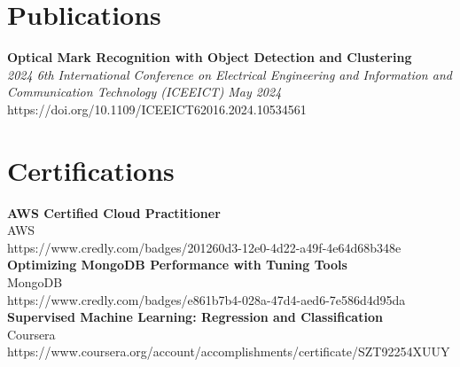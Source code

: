 \documentclass[a4paper,10pt]{article}
\begin{document}
\section*{Publications}
\textbf{Optical Mark Recognition with Object Detection and Clustering}\\
\textit{2024 6th International Conference on Electrical Engineering and Information and Communication Technology (ICEEICT)} \hfill \textit{May 2024}\\
\small https://doi.org/10.1109/ICEEICT62016.2024.10534561\\
\vspace{2pt}
\section*{Certifications}
\textbf{AWS Certified Cloud Practitioner}\\
\small AWS\\
\small https://www.credly.com/badges/201260d3-12e0-4d22-a49f-4e64d68b348e\\
\textbf{Optimizing MongoDB Performance with Tuning Tools}\\
\small MongoDB\\
\small https://www.credly.com/badges/e861b7b4-028a-47d4-aed6-7e586d4d95da\\
\textbf{Supervised Machine Learning: Regression and Classification}\\
\small Coursera\\
\small https://www.coursera.org/account/accomplishments/certificate/SZT92254XUUY\\
\vspace{2pt}
\end{document}
